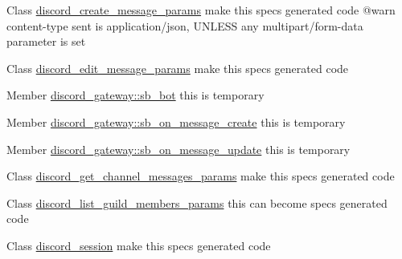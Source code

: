 
\begin{DoxyRefList}
\item[Class \mbox{\hyperlink{structdiscord__create__message__params}{discord\+\_\+create\+\_\+message\+\_\+params}} ]\label{todo__todo000008}%
%
make this specs generated code @warn content-\/type sent is {\ttfamily application/json}, U\+N\+L\+E\+SS any {\ttfamily multipart/form-\/data} parameter is set  
\item[Class \mbox{\hyperlink{structdiscord__edit__message__params}{discord\+\_\+edit\+\_\+message\+\_\+params}} ]\label{todo__todo000009}%
%
make this specs generated code  
\item[Member \mbox{\hyperlink{structdiscord__gateway_a3595a1cbbd88f6a10d736d2f28e8ca3e}{discord\+\_\+gateway::sb\+\_\+bot}} ]\label{todo__todo000001}%
%
this is temporary  
\item[Member \mbox{\hyperlink{structdiscord__gateway_af747d62ba16af1be83cd9d60f1171f00}{discord\+\_\+gateway::sb\+\_\+on\+\_\+message\+\_\+create}} ]\label{todo__todo000002}%
%
this is temporary  
\item[Member \mbox{\hyperlink{structdiscord__gateway_a32ad1c84342e9c685bcfdf8ad5fc5f3e}{discord\+\_\+gateway::sb\+\_\+on\+\_\+message\+\_\+update}} ]\label{todo__todo000003}%
%
this is temporary  
\item[Class \mbox{\hyperlink{structdiscord__get__channel__messages__params}{discord\+\_\+get\+\_\+channel\+\_\+messages\+\_\+params}} ]\label{todo__todo000007}%
%
make this specs generated code  
\item[Class \mbox{\hyperlink{structdiscord__list__guild__members__params}{discord\+\_\+list\+\_\+guild\+\_\+members\+\_\+params}} ]\label{todo__todo000010}%
%
this can become specs generated code  
\item[Class \mbox{\hyperlink{structdiscord__session}{discord\+\_\+session}} ]\label{todo__todo000006}%
%
make this specs generated code 
\end{DoxyRefList}